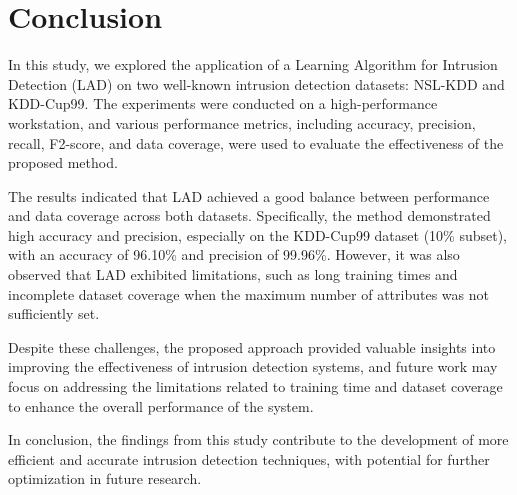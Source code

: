 \documentclass[pdflatex,sn-mathphys-num]{sn-jnl}%
\theoremstyle{thmstyleone}%
\theoremstyle{thmstyletwo}%
\theoremstyle{thmstylethree}%
\begin{document}
\section{Conclusion} \label{sec:Conclusion}

In this study, we explored the application of a Learning Algorithm for Intrusion Detection (LAD) on two well-known intrusion detection datasets: NSL-KDD and KDD-Cup99. The experiments were conducted on a high-performance workstation, and various performance metrics, including accuracy, precision, recall, F2-score, and data coverage, were used to evaluate the effectiveness of the proposed method.

The results indicated that LAD achieved a good balance between performance and data coverage across both datasets. Specifically, the method demonstrated high accuracy and precision, especially on the KDD-Cup99 dataset (10\% subset), with an accuracy of 96.10\% and precision of 99.96\%. However, it was also observed that LAD exhibited limitations, such as long training times and incomplete dataset coverage when the maximum number of attributes was not sufficiently set.

Despite these challenges, the proposed approach provided valuable insights into improving the effectiveness of intrusion detection systems, and future work may focus on addressing the limitations related to training time and dataset coverage to enhance the overall performance of the system.

In conclusion, the findings from this study contribute to the development of more efficient and accurate intrusion detection techniques, with potential for further optimization in future research.






\end{document}
